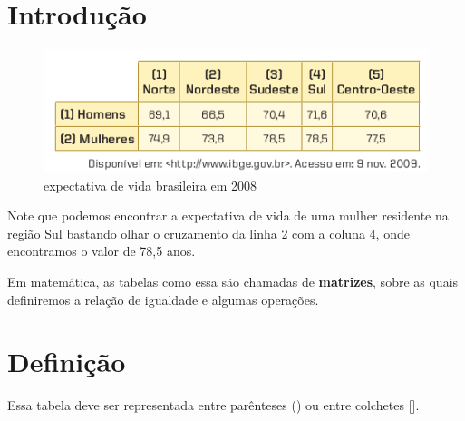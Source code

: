 \section{Introdução}

\begin{figure}[htb!]
	\centering
	\includegraphics[width=.6\linewidth]{images/quadro.png}
	\caption{expectativa de vida brasileira em 2008}
	\label{fig:}
\end{figure}

Note que podemos encontrar a expectativa de vida de uma mulher residente na região Sul bastando olhar o cruzamento da linha 2 com a coluna 4, onde encontramos o valor de 78,5 anos.

Em matemática, as tabelas como essa são chamadas de \textbf{matrizes}, sobre as quais definiremos a relação de igualdade e algumas operações.

\section{Definição}

Essa tabela deve ser representada entre parênteses () ou entre colchetes [].

\begin{examples}\leavevmode

	\begin{tasks}
	\end{tasks}

\end{examples}


